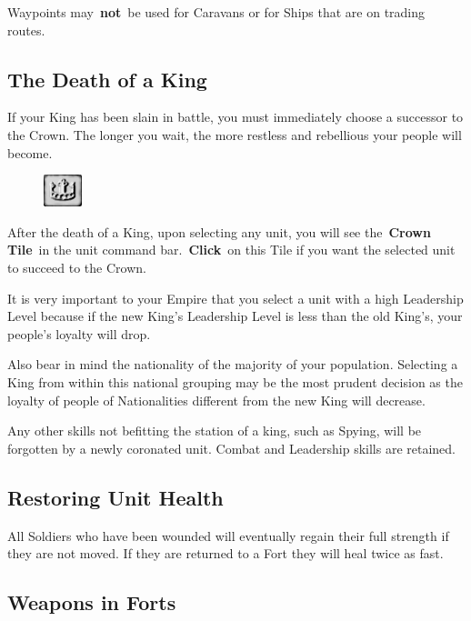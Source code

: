 Waypoints may \textbf{not} be used for Caravans or for Ships that are on trading routes.

\subsection{The Death of a King}

If your King has been slain in battle, you must immediately choose a successor to the Crown. The longer you wait, the more restless and rebellious your people will become.

\begin{figure}
	\vspace{-20pt}
	\begin{center}
		\includegraphics[width=0.1\textwidth]{Tcrown}
	\end{center}
	\vspace{-20pt}
\end{figure}

After the death of a King, upon selecting any unit, you will see the \textbf{Crown Tile} in the unit command bar. \textbf{Click} on this Tile if you want the selected unit to succeed to the Crown.

It is very important to your Empire that you select a unit with a high Leadership Level because if the new King’s Leadership Level is less than the old King’s, your people’s loyalty will drop.

Also bear in mind the nationality of the majority of your population. Selecting a King from within this national grouping may be the most prudent decision as the loyalty of people of Nationalities different from the new King will decrease.

Any other skills not befitting the station of a king, such as Spying, will be forgotten by a newly coronated unit. Combat and Leadership skills are retained.

\subsection{Restoring Unit Health}

All Soldiers who have been wounded will eventually regain their full strength if they are not moved. If they are returned to a Fort they will heal twice as fast.

\subsection{Weapons in Forts}

